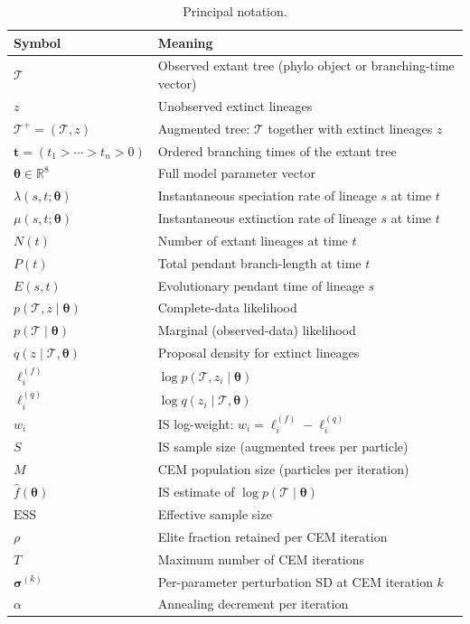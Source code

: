 \documentclass[12pt,a4paper]{article}
\newcommand{\obs}{\mathcal{T}}
\newcommand{\aug}{\mathcal{T}^+}
\newcommand{\brts}{\mathbf{t}}
\newcommand{\pars}{\bm{\theta}}
\newcommand{\fhat}{\widehat{f}}
\newcommand{\R}{\mathbb{R}}
\newcommand{\logf}{\ell^{(f)}}
\newcommand{\logq}{\ell^{(q)}}
\newcommand{\lw}{w}
\newcommand{\ESS}{\mathrm{ESS}}
\begin{document}
\begin{table}[ht]
\centering
\caption{Principal notation.}\label{tab:notation}
\renewcommand{\arraystretch}{1.25}
\begin{tabular}{lp{10cm}}
\toprule
Symbol & Meaning \\
\midrule
$\obs$ & Observed extant tree (phylo object or branching-time vector) \\
$z$ & Unobserved extinct lineages \\
$\aug = (\obs, z)$ & Augmented tree: $\obs$ together with extinct lineages $z$ \\
$\brts = (t_1 > \cdots > t_n > 0)$ & Ordered branching times of the extant tree \\
$\pars \in \R^8$ & Full model parameter vector \\
$\lambda(s,t;\pars)$ & Instantaneous speciation rate of lineage $s$ at time $t$ \\
$\mu(s,t;\pars)$ & Instantaneous extinction rate of lineage $s$ at time $t$ \\
$N(t)$ & Number of extant lineages at time $t$ \\
$P(t)$ & Total pendant branch-length at time $t$ \\
$E(s,t)$ & Evolutionary pendant time of lineage $s$ \\
$p(\obs, z \mid \pars)$ & Complete-data likelihood \\
$p(\obs \mid \pars)$ & Marginal (observed-data) likelihood \\
$q(z \mid \obs, \pars)$ & Proposal density for extinct lineages \\
$\logf_i$ & $\log p(\obs, z_i \mid \pars)$ \\
$\logq_i$ & $\log q(z_i \mid \obs, \pars)$ \\
$\lw_i$ & IS log-weight: $\lw_i = \logf_i - \logq_i$ \\
$S$ & IS sample size (augmented trees per particle) \\
$M$ & CEM population size (particles per iteration) \\
$\fhat(\pars)$ & IS estimate of $\log p(\obs \mid \pars)$ \\
$\ESS$ & Effective sample size \\
$\rho$ & Elite fraction retained per CEM iteration \\
$T$ & Maximum number of CEM iterations \\
$\bm{\sigma}^{(k)}$ & Per-parameter perturbation SD at CEM iteration $k$ \\
$\alpha$ & Annealing decrement per iteration \\
\bottomrule
\end{tabular}
\end{table}
\end{document}
